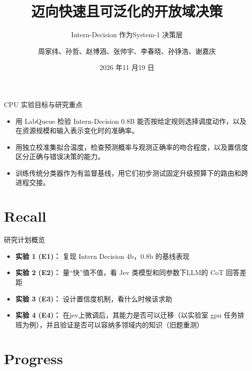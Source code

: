 \documentclass{beamer}
\title{迈向快速且可泛化的开放域决策}
\subtitle{Intern-Decision 作为System-1 决策层}
\author{周家纬、孙哲、赵博涵、张帅宇、李春晓、孙铮浩、谢嘉庆}
\date{2026 年11 月19 日}
\begin{document}
\maketitle

\begin{frame}{CPU 实验目标与研究重点}
\begin{itemize}
    \item 用 LabQueue 检验 Intern-Decision 0.8B 能否按给定规则选择调度动作，以及在资源规模和输入表示变化时的准确率。
    \item 用独立校准集拟合温度，检查预测概率与观测正确率的吻合程度，以及置信度区分正确与错误决策的能力。
    \item 训练传统分类器作为有监督基线，用它们初步测试固定升级预算下的路由和跨进程交接。
\end{itemize}
\end{frame}

\section{Recall}

\begin{frame}{研究计划概览}
\begin{itemize}
    \item \textbf{实验 1 (E1)：} 复现 Intern Decision 4b，0.8b 的基线表现
    \item \textbf{实验 2 (E2)：} 量“快”值不值，看 Jev 类模型和同参数下LLM的 CoT 回答差距
    \item \textbf{实验 3 (E3)：} 设计置信度机制，看什么时候该求助
    \item \textbf{实验 4 (E4)：} 在jev上微调后，其能力是否可以迁移（以实验室 gpu 任务排班为例），并且验证是否可以容纳多领域内的知识（旧题重测）
\end{itemize}
\end{frame}

\section{Progress}
\end{document}
